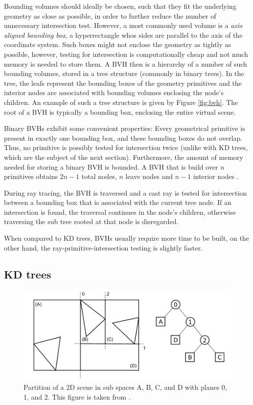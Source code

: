 Bounding volumes should ideally be chosen, such that they fit the underlying geometry as close as possible, in order to further reduce the number of unnecessary intersection test. However, a most commonly used volume is a \emph{axis aligned bounding box}, a hyperrectangle whos sides are parallel to the axis of the coordinate system. Such boxes might not enclose the geometry as tightly as possible, however, testing for intersection is computationally cheap and not much memory is needed to store them.
A BVH then is a hierarchy of a number of such bounding volumes, stored in a tree structure (commonly in binary trees). In the tree, the leafs represent the bounding boxes of the geometry primitives and the interior nodes are associated with bounding volumes enclosing the node's children. An example of such a tree structure is given by Figure \ref{fig:bvh}. The root of a BVH is typically a bounding box, enclosing the entire virtual scene.

Binary BVHs exhibit some convenient properties: Every geometrical primitive is present in exactly one bounding box, and these bounding boxes do not overlap. Thus, no primitive is possibly tested for intersection twice (unlike with KD trees, which are the subject of the next section). Furthermore, the amount of memory needed for storing a binary BVH is bounded. A BVH that is build over $n$ primitives obtains $2n-1$ total nodes, $n$ leave nodes and $n-1$ interior nodes \cite{pharr2016physically}. 

During ray tracing, the BVH is traversed and a cast ray is tested for intersection between a bounding box that is associated with the current tree node. If an intersection is found, the traversal continues in the node's children, otherwise traversing the sub tree rooted at that node is disregarded.

When compared to KD trees, BVHs usually require more time to be built, on the other hand, the ray-primitive-intersection testing is slightly faster. 

\subsection{KD trees}

\begin{figure}
	\centering
	\includegraphics[width=1\linewidth]{img/1 fundamentals/kd_tree.png}
	\caption{Partition of a 2D scene in sub spaces A, B, C, and D with planes 0, 1, and 2. This figure is taken from \cite{hapala2011kd}.}
	\label{fig:kdtree}
\end{figure}


